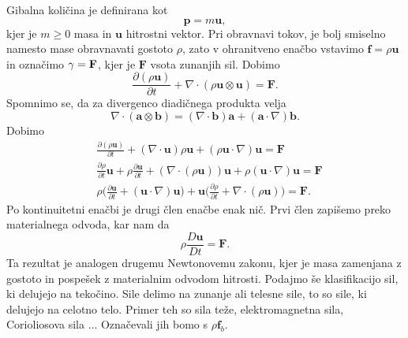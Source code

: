 \documentclass[mat2, tisk]{fmfdelo}
\newcommand{\bd}{\textbf}
\begin{document}
Gibalna količina je definirana kot
\begin{equation}
\bd{p} = m \bd{u},
\end{equation}
kjer je $m\geq 0$ masa in $\bd{u}$ hitrostni vektor. Pri obravnavi tokov, 
je bolj smiselno namesto mase obravnavati gostoto $\rho$, zato
v ohranitveno enačbo vstavimo $\bd{f} = \rho\bd{u}$ in označimo $\bd{\text{$\gamma$}} = \bd{F}$, kjer je $\bd{F}$ vsota zunanjih sil. Dobimo
\begin{equation}
\frac{\partial (\rho \bd{u})}{\partial t} + \nabla \cdot (\rho \bd{u} \otimes \bd{u}) = \bd{F}.
\end{equation}
Spomnimo se, da za divergenco diadičnega produkta velja
\begin{equation}
\nabla \cdot (\bd{a} \otimes \bd{b}) = (\nabla \cdot \bd{b}) \bd{a} + (\bd{a} \cdot \nabla) \bd{b}.
\end{equation}
Dobimo 
\begin{align*}
&\frac{\partial (\rho \bd{u})}{\partial t} + (\nabla \cdot \bd{u}) \rho \bd{u} + (\rho \bd{u} \cdot \nabla) \bd{u} = \bd{F} \\
&\frac{\partial \rho}{\partial t} \bd{u} + \rho\frac{\partial \bd{u}}{\partial t} + (\nabla \cdot (\rho\bd{u})) \bd{u} + \rho(\bd{u} \cdot \nabla) \bd{u} = \bd{F} \\
&\rho \Big(\frac{\partial \bd{u}}{\partial t} + (\bd{u} \cdot \nabla) \bd{u}\Big) + \bd{u} \Big(\frac{\partial \rho}{\partial t} + \nabla \cdot (\rho\bd{u}) \Big) = \bd{F}.
\end{align*}
Po kontinuitetni enačbi je drugi člen enačbe enak nič. Prvi člen zapišemo preko 
materialnega odvoda, kar nam da 
\begin{equation}
\rho \frac{D \bd{u}}{D t} = \bd{F}.
\end{equation}
Ta rezultat je analogen drugemu Newtonovemu zakonu, kjer je masa zamenjana z gostoto in pospešek z materialnim odvodom hitrosti.
Podajmo še klasifikacijo sil, ki delujejo na tekočino. Sile delimo na zunanje ali telesne sile, 
to so sile, ki delujejo na celotno telo. Primer teh so sila teže, elektromagnetna sila, 
Corioliosova sila ... Označevali jih bomo s $\rho \bd{f}_b$. 
\end{document}
